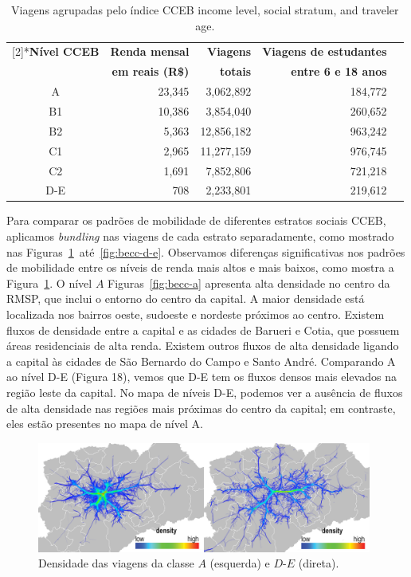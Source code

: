 \begin{table}[!htb]
  \small
  \newcommand{\hdr}[1]{\bfseries#1}
  \centering
  \caption{Viagens agrupadas pelo índice CCEB income level, social stratum, and traveler age.\label{tab:becc}}
  \begin{tabular}{>{\footnotesize}c>{\footnotesize}r>{\footnotesize}r>{\footnotesize}r>{\footnotesize}r}
    \toprule
    \multirow{2}[2]{*}{\hdr{Nível CCEB}} & \hdr{Renda mensal} & \hdr{Viagens} & \hdr{Viagens de estudantes}\\
    & \hdr{em reais (R\$)} & \hdr{totais} & \hdr{entre 6 e 18 anos}\\
    \midrule
    A   & 23,345    & 3,062,892  &   184,772\\
    B1  & 10,386    & 3,854,040  &   260,652\\
    B2  & 5,363     & 12,856,182 &   963,242\\
    C1  & 2,965     & 11,277,159 &   976,745\\
    C2  & 1,691     & 7,852,806  &   721,218\\
    D-E & 708       & 2,233,801  &   219,612\\
    \bottomrule
  \end{tabular}
\end{table}

Para comparar os padrões de mobilidade de diferentes estratos sociais CCEB,
aplicamos \emph{bundling} nas viagens de cada estrato separadamente, como
mostrado nas Figuras~\ref{fig:becc-axd-e}~até~\ref{fig:becc-d-e}. Observamos
diferenças significativas nos padrões de mobilidade entre os níveis de renda
mais altos e mais baixos, como mostra a Figura~\ref{fig:becc-axd-e}. O nível $A$
Figuras~\ref{fig:becc-a} apresenta alta densidade no centro da RMSP, que inclui
o entorno do centro da capital. A maior densidade está localizada nos bairros
oeste, sudoeste e nordeste próximos ao centro. Existem fluxos de densidade entre
a capital e as cidades de Barueri e Cotia, que possuem áreas residenciais de
alta renda. Existem outros fluxos de alta densidade ligando a capital às cidades
de São Bernardo do Campo e Santo André. Comparando A ao nível D-E (Figura 18),
vemos que D-E tem os fluxos densos mais elevados na região leste da capital. No
mapa de níveis D-E, podemos ver a ausência de fluxos de alta densidade nas
regiões mais próximas do centro da capital; em contraste, eles estão presentes
no mapa de nível A.

\begin{figure}[!htb]
  \centering
  \captionsetup{justification=centering}
  \includegraphics[width=0.98\textwidth]{../figuras/comparison-axd-e-strata-leg.png}
  \caption{Densidade das viagens da classe $A$ (esquerda) e $D$-$E$ (direta). \label{fig:becc-axd-e}}
\end{figure}

